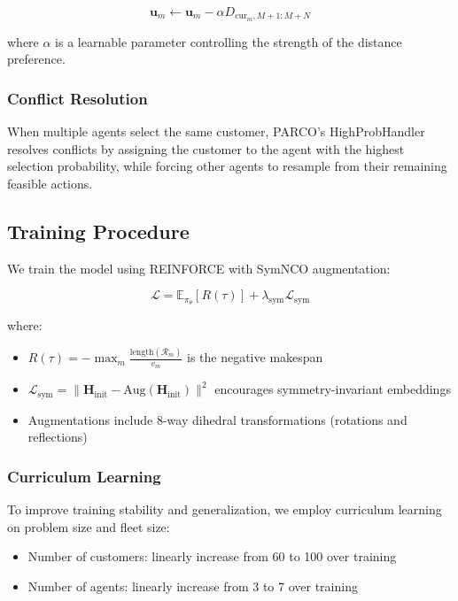 \documentclass[lettersize,journal]{IEEEtran}
\begin{document}
\begin{equation}
\mathbf{u}_m \leftarrow \mathbf{u}_m - \alpha D_{\text{cur}_m, M+1:M+N}
\end{equation}

where $\alpha$ is a learnable parameter controlling the strength of the distance preference.

\subsubsection{Conflict Resolution}

When multiple agents select the same customer, PARCO's HighProbHandler resolves conflicts by assigning the customer to the agent with the highest selection probability, while forcing other agents to resample from their remaining feasible actions.

\subsection{Training Procedure}

We train the model using REINFORCE with SymNCO augmentation:

\begin{equation}
\mathcal{L} = \mathbb{E}_{\pi_\theta}[R(\tau)] + \lambda_{\text{sym}} \mathcal{L}_{\text{sym}}
\end{equation}

where:
\begin{itemize}
\item $R(\tau) = -\max_m \frac{\text{length}(\mathcal{R}_m)}{v_m}$ is the negative makespan
\item $\mathcal{L}_{\text{sym}} = \|\mathbf{H}_{\text{init}} - \text{Aug}(\mathbf{H}_{\text{init}})\|^2$ encourages symmetry-invariant embeddings
\item Augmentations include 8-way dihedral transformations (rotations and reflections)
\end{itemize}

\subsubsection{Curriculum Learning}

To improve training stability and generalization, we employ curriculum learning on problem size and fleet size:

\begin{itemize}
\item Number of customers: linearly increase from 60 to 100 over training
\item Number of agents: linearly increase from 3 to 7 over training
\end{itemize}
\end{document}
